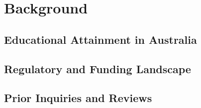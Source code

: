 \chapter{Background}
\label{ch:background}


\section{Educational Attainment in Australia}
\label{sec:background:context}

\lipsum[1-2]

\section{Regulatory and Funding Landscape}
\label{sec:background:regulation}

\lipsum[3]

\section{Prior Inquiries and Reviews}
\label{sec:background:prior}

\lipsum[4]
